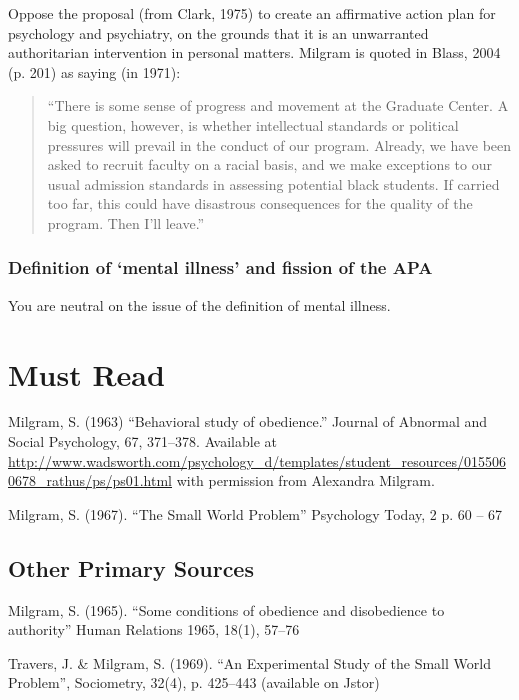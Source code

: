 \begin{refsection}
Oppose the proposal (from Clark, 1975) to create an affirmative action plan for psychology and psychiatry, on the grounds that it is an unwarranted authoritarian intervention in personal matters. Milgram is quoted in Blass, 2004 (p. 201) as saying (in 1971):

\begin{quote}

“There is some sense of progress and movement at the Graduate Center. A big question, however, is whether intellectual standards or political pressures will prevail in the conduct of our program. Already, we have been asked to recruit faculty on a racial basis, and we make exceptions to our usual admission standards in assessing potential black students. If carried too far, this could have disastrous consequences for the quality of the program. Then I'll leave.”
\end{quote}

\subsubsection{Definition of ‘mental illness’ and fission of the APA}
\label{definitionof‘mentalillness’andfissionoftheapa}

You are neutral on the issue of the definition of mental illness.

\section{Must Read}
\label{mustread}

Milgram, S. (1963) “Behavioral study of obedience.” Journal of Abnormal and Social Psychology, 67, 371–378. Available at \url{http://www.wadsworth.com/psychology_d/templates/student_resources/0155060678_rathus/ps/ps01.html} with permission from Alexandra Milgram.

Milgram, S. (1967). ``The Small World Problem'' Psychology Today, 2 p. 60 – 67

\subsection{Other Primary Sources}
\label{otherprimarysources}

Milgram, S. (1965). “Some conditions of obedience and disobedience to authority” Human Relations 1965, 18(1), 57--76

Travers, J. \& Milgram, S. (1969). “An Experimental Study of the Small World Problem”, Sociometry, 32(4), p. 425--443 (available on Jstor)


\end{refsection}
